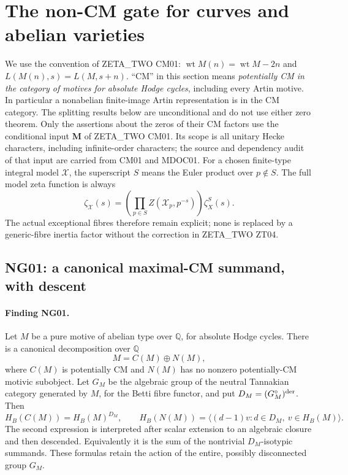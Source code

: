 
\section{The non-CM gate for curves and abelian varieties}
\label{sec:noncm-gate-next}

We use the convention of ZETA\_TWO CM01:
$\operatorname{wt} M(n)=\operatorname{wt}M-2n$ and
$L(M(n),s)=L(M,s+n)$.  ``CM'' in this section means
\emph{potentially CM in the category of motives for absolute Hodge
cycles}, including every Artin motive.  In particular a nonabelian
finite-image Artin representation is in the CM category.  The splitting
results below are unconditional and do not use either zero theorem.
Only the assertions about the zeros of their CM factors use the
conditional input \textbf{M} of ZETA\_TWO CM01.  Its scope is all unitary
Hecke characters, including infinite-order characters; the source and
dependency audit of that input are carried from CM01 and MDOC01.
For a chosen finite-type integral model $\mathcal X$, the superscript
$S$ means the Euler product over $p\notin S$.  The full model zeta
function is always
\[
 \zeta_{\mathcal X}(s)=
       \left(\prod_{p\in S}Z(\mathcal X_p,p^{-s})\right)
                                  \zeta_X^S(s).
\]
The actual exceptional fibres therefore remain explicit; none is
replaced by a generic-fibre inertia factor without the correction in
ZETA\_TWO ZT04.

\subsection{NG01: a canonical maximal-CM summand, with descent}
\label{NG01}

\paragraph{Finding NG01.}
Let $M$ be a pure motive of abelian type over $\mathbb Q$, for absolute
Hodge cycles.  There is a canonical decomposition over $\mathbb Q$
\[
                    M=C(M)\oplus N(M),                         \tag{NG01.1}
\]
where $C(M)$ is potentially CM and $N(M)$ has no nonzero potentially-CM
motivic subobject.  Let $G_M$ be the algebraic group of the neutral
Tannakian category generated by $M$, for the Betti fibre functor, and put
$D_M=(G_M^\circ)^{\rm der}$.  Then
\[
 H_B(C(M))=H_B(M)^{D_M},\qquad
 H_B(N(M))=\langle (d-1)v:d\in D_M,\ v\in H_B(M)\rangle.       \tag{NG01.2}
\]
The second expression is interpreted after scalar extension to an
algebraic closure and then descended.  Equivalently it is the sum of the
nontrivial $D_M$-isotypic summands.  These formulas retain the action of
the entire, possibly disconnected group $G_M$.


